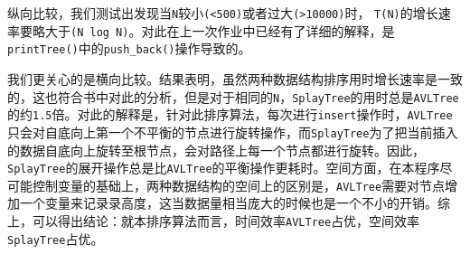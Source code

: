 \documentclass[a4paper,12pt]{article}
\begin{document}
\begin{enumerate}
\begin{enumerate}
     纵向比较，我们测试出发现当\verb|N|较小\verb|(<500)|或者过大\verb|(>10000)|时， 
     \verb|T(N)|的增长速率要略大于\verb|(N log N)|。{\hei 对此在上一次作业中已经有了详细的解释，是\verb|printTree()|中的\verb|push_back()|操作导致的。}
     
     我们更关心的是横向比较。结果表明，虽然两种数据结构排序用时增长速率是一致的，这也符合书中对此的分析，但是{\hei 对于相同的\verb|N|，\verb|SplayTree|的用时总是\verb|AVLTree|的约\verb|1.5|倍}。对此的解释是，针对此排序算法，每次进行\verb|insert|操作时，\verb|AVLTree|只会对自底向上第一个不平衡的节点进行旋转操作，而\verb|SplayTree|为了把当前插入的数据自底向上旋转至根节点，会对路径上每一个节点都进行旋转。因此，\verb|SplayTree|的展开操作总是比\verb|AVLTree|的平衡操作更耗时。{\hei 空间方面}，在本程序尽可能控制变量的基础上，两种数据结构的空间上的区别是，\verb|AVLTree|需要对节点增加一个变量来记录录高度，这当数据量相当庞大的时候也是一个不小的开销。综上，可以得出结论：{\hei 就本排序算法而言，时间效率\verb|AVLTree|占优，空间效率\verb|SplayTree|占优。}

\end{enumerate}
\end{enumerate}



\end{document}
